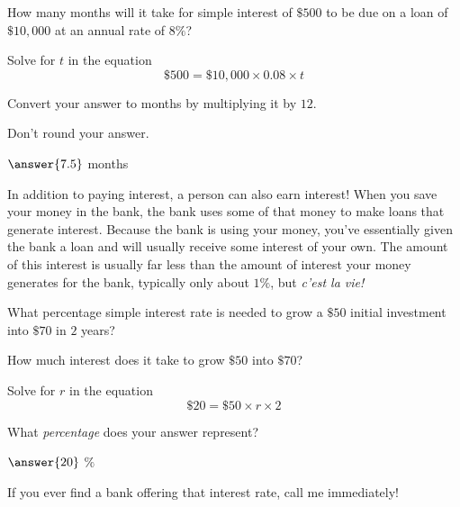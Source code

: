 \documentclass{ximera}
\begin{document}
\begin{question}
How many months will it take for simple interest of $\$500$ to be due on a loan of $\$10,000$ at an annual rate of $8\%$? 	

\begin{hint}
Solve for $t$ in the equation
\begin{equation*}\$500=\$10,000\times 0.08\times t\end{equation*}
\end{hint}
\begin{hint}
Convert your answer to months by multiplying it by $12$.
\end{hint}
\begin{hint}
Don't round your answer.
\end{hint}
$\answer{7.5}$ months

\end{question}

In addition to paying interest, a person can also earn interest! When you save your money in the bank, the bank uses some of that money to make loans that generate interest. Because the bank is using your money, you've essentially given the bank a loan and will usually receive some interest of your own. The amount of this interest is usually far less than the amount of interest your money generates for the bank, typically only about $1\%$, but \emph{c'est la vie!}

\begin{question}
What percentage simple interest rate is needed to grow a $\$50$ initial investment into $\$70$ in $2$ years?


\begin{hint}
How much interest does it take to grow $\$50$ into $\$70$?
\end{hint}
\begin{hint}
Solve for $r$ in the equation
\begin{equation*}\$20=\$50\times r\times 2\end{equation*}
\end{hint}
\begin{hint}
What \emph{percentage} does your answer represent?
\end{hint}
$\answer{20}$ $\%$


If you ever find a bank offering that interest rate, call me immediately!
\end{question}
\end{document}
